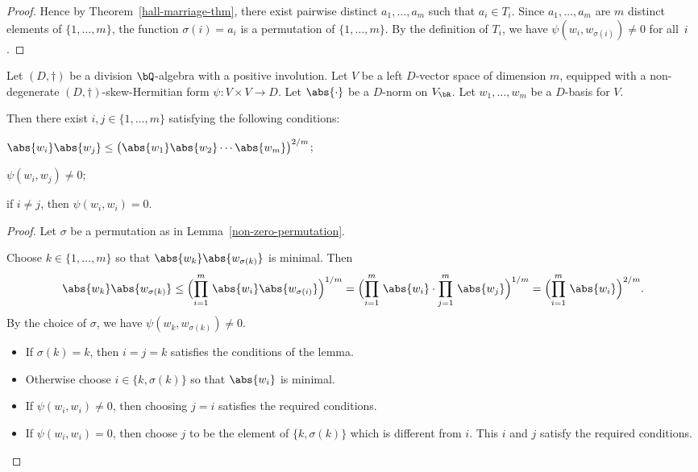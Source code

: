 \begin{proof}
Hence by Theorem~\ref{hall-marriage-thm}, there exist pairwise distinct $a_1, \dotsc, a_m$ such that $a_i \in T_i$. Since $a_1, \dotsc, a_m$ are $m$ distinct elements of $\{1, \dotsc, m \}$, the function $\sigma(i) = a_i$ is a permutation of $\{ 1, \dotsc, m \}$.
By the definition of $T_i$, we have $\psi(w_i, w_{\sigma(i)}) \neq 0$ for all~$i$.
\end{proof}

\begin{lemma} \label{short-non-degenerate-vectors}
Let $(D,\dag)$ be a division $\bQ$-algebra with a positive involution.
Let $V$ be a left $D$-vector space of dimension $m$, equipped with a non-degenerate $(D,\dag)$-skew-Hermitian form $\psi \colon V \times V \to D$.
Let $\abs{\cdot}$ be a $D$-norm on $V_\bR$.
Let $w_1, \dotsc, w_m$ be a $D$-basis for $V$.

Then there exist $i,j \in \{ 1, \dotsc, m \}$ satisfying the following conditions:
\begin{enumeratei}
\item $\abs{w_i}\abs{w_j} \leq \bigl( \abs{w_1} \abs{w_2} \dotsm \abs{w_m} \bigr)^{2/m}$;
\item $\psi(w_i, w_j) \neq 0$;
\item if $i \neq j$, then $\psi(w_i,w_i) = 0$.
\end{enumeratei}
\end{lemma}

\begin{proof}
Let $\sigma$ be a permutation as in Lemma~\ref{non-zero-permutation}.

Choose $k \in \{ 1, \dotsc, m \}$ so that $\abs{w_k} \abs{w_{\sigma(k)}}$ is minimal.
Then
\[
\abs{w_k} \abs{w_{\sigma(k)}}
\leq \Bigl( \prod_{i=1}^m\, \abs{w_i} \abs{w_{\sigma(i)}} \Bigr)^{1/m}
= \Bigl( \prod_{i=1}^m\, \abs{w_i} \cdot \prod_{j=1}^m\, \abs{w_j} \Bigr)^{1/m}
= \Bigl( \prod_{i=1}^m\, \abs{w_i} \Bigr)^{2/m}.
\]
By the choice of $\sigma$, we have $\psi(w_k, w_{\sigma(k)}) \neq 0$.

\begin{itemize}
\item
If $\sigma(k) = k$, then $i=j=k$ satisfies the conditions of the lemma.

\item
Otherwise choose $i \in \{ k, \sigma(k) \}$ so that $\abs{w_i}$ is minimal.

\item
If $\psi(w_i, w_i) \neq 0$, then choosing $j=i$ satisfies the required conditions.

\item
If $\psi(w_i, w_i) = 0$, then choose $j$ to be the element of $\{ k, \sigma(k) \}$ which is different from $i$.
This $i$ and $j$ satisfy the required conditions.\qedhere
\end{itemize}
\end{proof}


